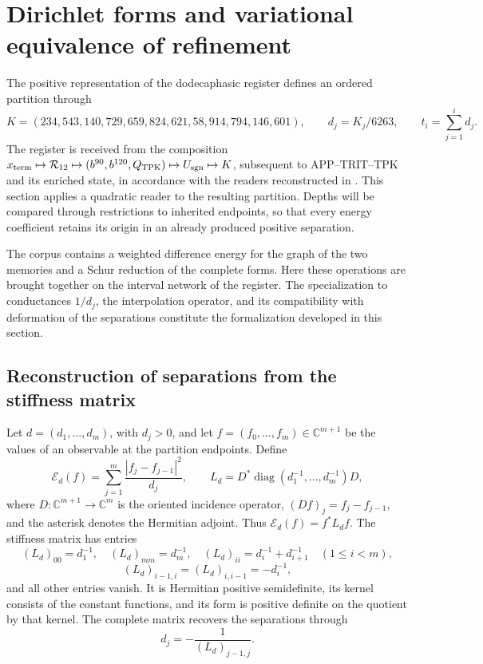 \section{Dirichlet forms and variational equivalence of refinement}
\label{sec:energia-refinamiento-k}

The positive representation of the dodecaphasic register defines an
ordered partition through
\[
 K=(234,543,140,729,659,824,621,58,914,794,146,601),
 \qquad d_j=K_j/6263,
 \qquad t_i=\sum_{j=1}^id_j.
\]
The register is received from the composition
\(x_{\rm term}\mapsto\mathcal R_{12}\mapsto
(b^{90},b^{120},Q_{\rm TPK})\mapsto U_{\rm sgn}\mapsto K\),
subsequent to APP--TRIT--TPK and its enriched state, in accordance
with the readers reconstructed in \cite{hmtX}. This section applies
a quadratic reader to the resulting partition. Depths will be compared
through restrictions to inherited endpoints, so that every energy
coefficient retains its origin in an already produced positive separation.

The corpus contains a weighted difference energy for the graph of
the two memories and a Schur reduction of the complete forms.
Here these operations are brought together on the interval network
of the register. The specialization to conductances \(1/d_j\),
the interpolation operator, and its compatibility with deformation
of the separations constitute the formalization developed in this section.

\subsection{Reconstruction of separations from the stiffness matrix}

Let \(d=(d_1,\ldots,d_m)\), with \(d_j>0\), and let
\(f=(f_0,\ldots,f_m)\in\mathbb C^{m+1}\) be the values of an
observable at the partition endpoints. Define
\begin{equation}
 \mathcal E_d(f)=\sum_{j=1}^{m}\frac{|f_j-f_{j-1}|^2}{d_j},
 \qquad L_d=D^*\operatorname{diag}(d_1^{-1},\ldots,d_m^{-1})D,
 \label{eq:energia-intervalar}
\end{equation}
where \(D:\mathbb C^{m+1}\to\mathbb C^m\) is the oriented incidence
operator, \((Df)_j=f_j-f_{j-1}\), and the asterisk denotes the
Hermitian adjoint. Thus \(\mathcal E_d(f)=f^*L_df\).
The stiffness matrix has entries
\[
 (L_d)_{00}=d_1^{-1},\quad (L_d)_{mm}=d_m^{-1},\quad
 (L_d)_{ii}=d_i^{-1}+d_{i+1}^{-1}\quad(1\le i<m),
\]
\[
 (L_d)_{i-1,i}=(L_d)_{i,i-1}=-d_i^{-1},
\]
and all other entries vanish. It is Hermitian positive semidefinite,
its kernel consists of the constant functions, and its form is positive
definite on the quotient by that kernel. The complete matrix recovers
the separations through
\begin{equation}
 d_j=-\frac1{(L_d)_{j-1,j}}.
 \label{eq:recuperacion-d-rigidez}
\end{equation}

